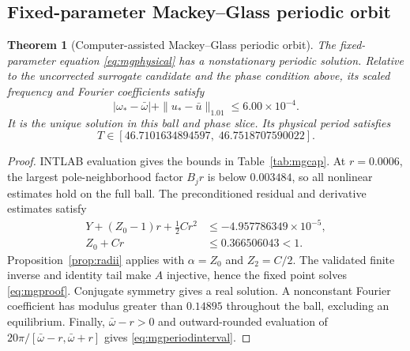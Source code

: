 \documentclass[11pt]{article}
\newtheorem{theorem}[proposition]{Theorem}
\begin{document}
\subsection{Fixed-parameter Mackey--Glass periodic orbit}
\begin{samepage}
\begin{theorem}[Computer-assisted Mackey--Glass periodic orbit]
\label{thm:mgorbit}
The fixed-parameter equation \eqref{eq:mgphysical} has a nonstationary periodic solution. Relative to the uncorrected surrogate candidate and the phase condition above, its scaled frequency and Fourier coefficients satisfy
\begin{equation}
 |\omega_*-\bar\omega|+\|u_*-\bar u\|_{1.01}
 \leq6.00\times10^{-4}.
 \label{eq:mgcertifiedradius}
\end{equation}
It is the unique solution in this ball and phase slice. Its physical period satisfies
\begin{equation}
 T\in[46.7101634894597,\;46.7518707590022].
 \label{eq:mgperiodinterval}
\end{equation}
\end{theorem}
\end{samepage}
\begin{proof}
INTLAB evaluation gives the bounds in Table~\ref{tab:mgcap}. At $r=0.0006$, the largest pole-neighborhood factor $B_jr$ is below $0.003484$, so all nonlinear estimates hold on the full ball. The preconditioned residual and derivative estimates satisfy
\begin{align}
 Y+(Z_0-1)r+\tfrac12Cr^2&\leq-4.957786349\times10^{-5},\\
 Z_0+Cr&\leq0.366506043<1.
\end{align}
Proposition~\ref{prop:radii} applies with $\alpha=Z_0$ and $Z_2=C/2$. The validated finite inverse and identity tail make $A$ injective, hence the fixed point solves \eqref{eq:mgproof}. Conjugate symmetry gives a real solution. A nonconstant Fourier coefficient has modulus greater than $0.14895$ throughout the ball, excluding an equilibrium. Finally, $\bar\omega-r>0$ and outward-rounded evaluation of $20\pi/[\bar\omega-r,\bar\omega+r]$ gives \eqref{eq:mgperiodinterval}.
\end{proof}
\end{document}
